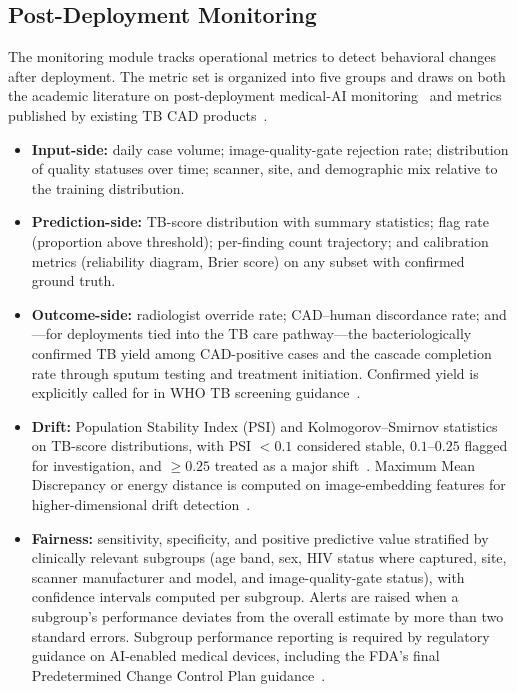 \documentclass[conference, letterpaper]{IEEEtran}
\begin{document}
\subsection{Post-Deployment Monitoring}

The monitoring module tracks operational metrics to detect behavioral changes after deployment. The metric set is organized into five groups and draws on both the academic literature on post-deployment medical-AI monitoring~\cite{finlayson2021shift, feng2022continual, merkow2024drift, rudolph2024postdeploy_cxr} and metrics published by existing TB CAD products~\cite{qxr_docs, cad4tb_product, lunit_product}.

\begin{itemize}
    \item \textbf{Input-side:} daily case volume; image-quality-gate rejection rate; distribution of quality statuses over time; scanner, site, and demographic mix relative to the training distribution.
    \item \textbf{Prediction-side:} TB-score distribution with summary statistics; flag rate (proportion above threshold); per-finding count trajectory; and calibration metrics (reliability diagram, Brier score) on any subset with confirmed ground truth.
    \item \textbf{Outcome-side:} radiologist override rate; CAD--human discordance rate; and---for deployments tied into the TB care pathway---the bacteriologically confirmed TB yield among CAD-positive cases and the cascade completion rate through sputum testing and treatment initiation. Confirmed yield is explicitly called for in WHO TB screening guidance~\cite{who_screening_2021}.
    \item \textbf{Drift:} Population Stability Index (PSI) and Kolmogorov--Smirnov statistics on TB-score distributions, with PSI $< 0.1$ considered stable, $0.1$--$0.25$ flagged for investigation, and $\geq 0.25$ treated as a major shift~\cite{feng2022continual}. Maximum Mean Discrepancy or energy distance is computed on image-embedding features for higher-dimensional drift detection~\cite{merkow2024drift, ghosh2024drift}.
    \item \textbf{Fairness:} sensitivity, specificity, and positive predictive value stratified by clinically relevant subgroups (age band, sex, HIV status where captured, site, scanner manufacturer and model, and image-quality-gate status), with confidence intervals computed per subgroup. Alerts are raised when a subgroup's performance deviates from the overall estimate by more than two standard errors. Subgroup performance reporting is required by regulatory guidance on AI-enabled medical devices, including the FDA's final Predetermined Change Control Plan guidance~\cite{fda_postmarket}.
\end{itemize}
\end{document}
